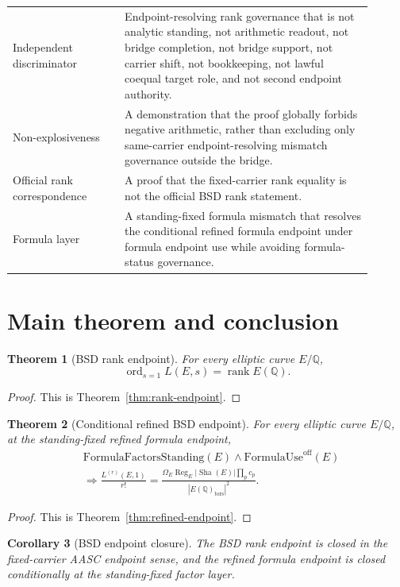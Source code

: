\documentclass[11pt]{article}
\newtheorem{theorem}{Theorem}[section]
\newtheorem{corollary}[theorem]{Corollary}
\newcommand{\Q}{\mathbb{Q}}
\newcommand{\Sha}{\operatorname{Sha}}
\newcommand{\rank}{\operatorname{rank}}
\newcommand{\ord}{\operatorname{ord}}
\newcommand{\Reg}{\operatorname{Reg}}
\newcommand{\tors}{\operatorname{tors}}
\newcommand{\FormulaUse}{\mathrm{FormulaUse}^{\mathrm{off}}}
\begin{document}
\begin{longtable}{L{0.28\linewidth}L{0.62\linewidth}}
Independent discriminator & Endpoint-resolving rank governance that is not analytic standing, not arithmetic readout, not bridge completion, not bridge support, not carrier shift, not bookkeeping, not lawful coequal target role, and not second endpoint authority.\\
Non-explosiveness & A demonstration that the proof globally forbids negative arithmetic, rather than excluding only same-carrier endpoint-resolving mismatch governance outside the bridge.\\
Official rank correspondence & A proof that the fixed-carrier rank equality is not the official BSD rank statement.\\
Formula layer & A standing-fixed formula mismatch that resolves the conditional refined formula endpoint under formula endpoint use while avoiding formula-status governance.\\
\bottomrule
\end{longtable}


\section{Main theorem and conclusion}

\begin{theorem}[BSD rank endpoint]
For every elliptic curve $E/\Q$,
\[
\ord_{s=1}L(E,s)=\rank E(\Q).
\]
\end{theorem}

\begin{proof}
This is Theorem~\ref{thm:rank-endpoint}.
\end{proof}

\begin{theorem}[Conditional refined BSD endpoint]
For every elliptic curve $E/\Q$, at the standing-fixed refined formula endpoint,
\[
\begin{aligned}
&\mathrm{FormulaFactorsStanding}(E)\wedge \FormulaUse(E)\\
&\Rightarrow
\frac{L^{(r)}(E,1)}{r!}
=
\frac{\Omega_E\Reg_E |\Sha(E)|\prod_p c_p}
{|E(\Q)_{\tors}|^2}.
\end{aligned}
\]
\end{theorem}

\begin{proof}
This is Theorem~\ref{thm:refined-endpoint}.
\end{proof}

\begin{corollary}[BSD endpoint closure]
The BSD rank endpoint is closed in the fixed-carrier AASC endpoint sense, and the refined formula endpoint is closed conditionally at the standing-fixed factor layer.
\end{corollary}
\end{document}
